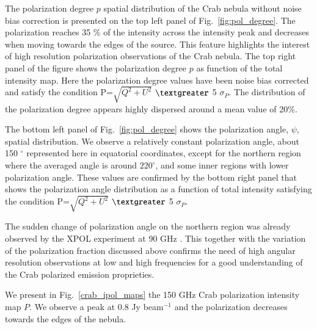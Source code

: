 \documentclass[twocolumn,traditabstract]{aa}
\begin{document}
The polarization degree $p$ spatial distribution of the Crab nebula without noise bias correction is presented on the top left panel of Fig.~\ref{fig:pol_degree}. The polarization reaches 35 \% of the intensity across the intensity peak and decreases when moving towards the edges of the source. 
This feature highlights the interest of high resolution polarization observations of the Crab nebula. The top right panel of the figure shows the polarization degree $p$ as function of the total intensity map. Here the polarization degree values have been noise bias corrected and satisfy the condition P=$\sqrt{Q^2+U^2}$ $\textgreater$ 5 $\sigma_P$. The distribution of the polarization degree appears highly dispersed around a mean value of 20\%.

The bottom left panel of Fig.~\ref{fig:pol_degree} shows  the polarization angle, $\psi$, spatial distribution.
We observe a relatively constant polarization angle, about 150 $^{\circ}$ represented here in equatorial coordinates, except for the northern region where the averaged angle is around $220^{\circ}$, and some inner regions with lower polarization angle.
These values are confirmed by the bottom right panel that shows the polarization angle distribution as a function of total intensity satisfying the condition P=$\sqrt{Q^2+U^2}$  $\textgreater$ 5 $\sigma_P$.

The sudden change of polarization angle on the northern region was already observed by the XPOL experiment at 90 GHz \citep{aumont2010}.
This together with the variation of the polarization fraction discussed above confirms the need of high angular resolution observations at low and high frequencies for a good understanding of the Crab polarized emission proprieties.

We present in Fig.~\ref{crab_ipol_maps} the 150 GHz Crab polarization intensity map $P$. We observe a peak at 0.8 Jy beam$^{-1}$ and the polarization decreases towards the edges of the nebula.

\end{document}
